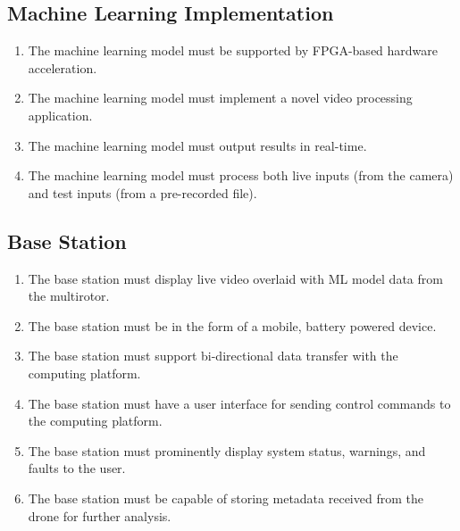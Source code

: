 \documentclass[10pt,letterpaper]{article}
\begin{document}
\subsection{Machine Learning Implementation}
\begin{enumerate}[label=F.ML.\arabic*, wide=1cm, widest=3cm, leftmargin=*, font=\bfseries, noitemsep,topsep=0pt, parsep=4pt, partopsep=0pt]
	\item The machine learning model must be supported by FPGA-based hardware acceleration.
	\item The machine learning model must implement a novel video processing application.
	\item The machine learning model must output results in real-time.
	\item The machine learning model must process both live inputs (from the camera) and test inputs (from a pre-recorded file). 
\end{enumerate}

\subsection{Base Station}
\begin{enumerate}[label=F.BS.\arabic*, wide=1cm, widest=3cm, leftmargin=*, font=\bfseries, noitemsep,topsep=0pt, parsep=4pt, partopsep=0pt]
    \item The base station must display live video overlaid with ML model data from the multirotor.
    \item The base station must be in the form of a mobile, battery powered device.
	\item The base station must support bi-directional data transfer with the computing platform.
	\item The base station must have a user interface for sending control commands to the computing platform.
	\item The base station must prominently display system status, warnings, and faults to the user.
    \item The base station must be capable of storing metadata received from the drone for further analysis.
\end{enumerate}
\end{document}
